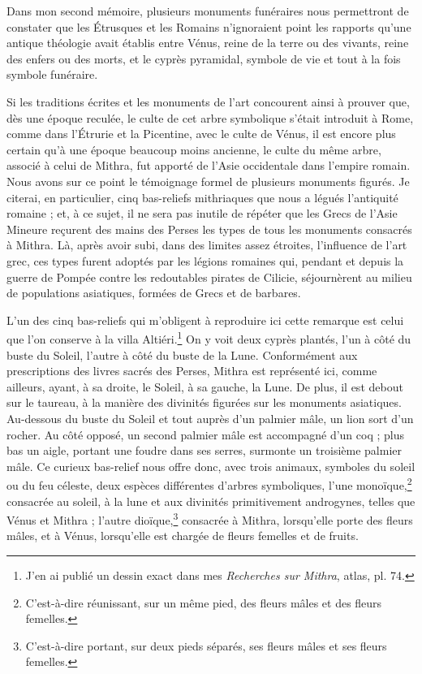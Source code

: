 \documentclass{article}
\begin{document}
Dans mon second mémoire, plusieurs monuments funéraires nous permettront de constater que les Étrusques et les Romains n'ignoraient point les rapports qu'une antique théologie avait établis entre Vénus, reine de la terre ou des vivants, reine des enfers ou des morts, et le cyprès pyramidal, symbole de vie et tout à la fois symbole funéraire.

Si les traditions écrites et les monuments de l'art concourent ainsi à prouver que, dès une époque reculée, le culte de cet arbre symbolique s'était introduit à Rome, comme dans l'Étrurie et la Picentine, avec le culte de Vénus, il est encore plus certain qu'à une époque beaucoup moins ancienne, le culte du même arbre, associé à celui de Mithra, fut apporté de l'Asie occidentale dans l'empire romain. Nous avons sur ce point le témoignage formel de plusieurs monuments figurés. Je citerai, en particulier, cinq bas-reliefs mithriaques que nous a légués l'antiquité romaine ; et, à ce sujet, il ne sera pas inutile de répéter que les Grecs de l'Asie Mineure reçurent des mains des Perses les types de tous les monuments consacrés à Mithra. Là, après avoir subi, dans des limites assez étroites, l'influence de l'art grec, ces types furent adoptés par les légions romaines qui, pendant et depuis la guerre de Pompée contre les redoutables pirates de Cilicie, séjournèrent au milieu de populations asiatiques, formées de Grecs et de barbares.

L'un des cinq bas-reliefs qui m'obligent à reproduire ici cette remarque est celui que l'on conserve à la villa Altiéri.\footnote{J'en ai publié un dessin exact dans mes \emph{Recherches sur Mithra}, atlas, pl. 74.} On y voit deux cyprès plantés, l'un à côté du buste du Soleil, l'autre à côté du buste de la Lune. Conformément aux prescriptions des livres sacrés des Perses, Mithra est représenté ici, comme ailleurs, ayant, à sa droite, le Soleil, à sa gauche, la Lune. De plus, il est debout sur le taureau, à la manière des divinités figurées sur les monuments asiatiques. Au-dessous du buste du Soleil et tout auprès d'un palmier mâle, un lion sort d'un rocher. Au côté opposé, un second palmier mâle est accompagné d'un coq ; plus bas un aigle, portant une foudre dans ses serres, surmonte un troisième palmier mâle. Ce curieux bas-relief nous offre donc, avec trois animaux, symboles du soleil ou du feu céleste, deux espèces différentes d'arbres symboliques, l'une monoïque,\footnote{C'est-à-dire réunissant, sur un même pied, des fleurs mâles et des fleurs femelles.} consacrée au soleil, à la lune et aux divinités primitivement androgynes, telles que Vénus et Mithra ; l'autre dioïque,\footnote{C'est-à-dire portant, sur deux pieds séparés, ses fleurs mâles et ses fleurs femelles.} consacrée à Mithra, lorsqu'elle porte des fleurs mâles, et à Vénus, lorsqu'elle est chargée de fleurs femelles et de fruits.
\end{document}
